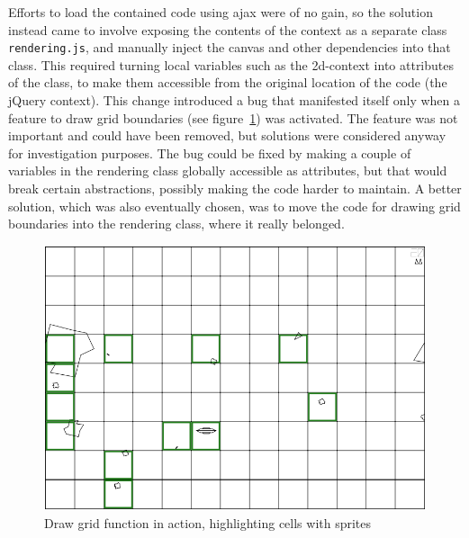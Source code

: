 \documentclass[11pt]{article}
\begin{document}
Efforts to load the contained code using ajax were of no gain, so the solution instead came to involve exposing the contents of the context as a separate class \texttt{rendering.js}, and manually inject the canvas and other dependencies into that class. This required turning local variables such as the 2d-context into attributes of the class, to make them accessible from the original location of the code (the jQuery context). This change introduced a bug that manifested itself only when a feature to draw grid boundaries (see figure~\ref{fig:game8}) was activated. The feature was not important and could have been removed, but solutions were considered anyway for investigation purposes. The bug could be fixed by making a couple of variables in the rendering class globally accessible as attributes, but that would break certain abstractions, possibly making the code harder to maintain. A better solution, which was also eventually chosen, was to move the code for drawing grid boundaries into the rendering class, where it really belonged.

\begin{figure}[ht!]
\centering
\includegraphics[width=1.0\textwidth]{pics/game8.png}
\caption{Draw grid function in action, highlighting cells with sprites}
\label{fig:game8}
\end{figure}
\end{document}
